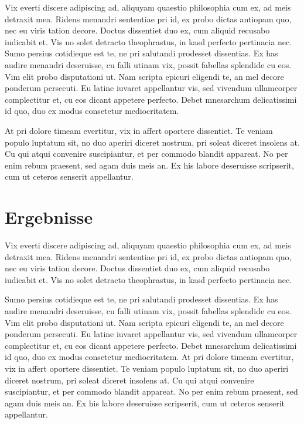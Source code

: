 Vix everti discere adipiscing ad, aliquyam quaestio philosophia cum ex, ad meis detraxit mea. Ridens menandri sententiae pri id, ex probo dictas antiopam quo, nec eu viris tation decore. Doctus dissentiet duo ex, cum aliquid recusabo iudicabit et. Vis no solet detracto theophrastus, in kasd perfecto pertinacia nec. Sumo persius cotidieque est te, ne pri salutandi prodesset dissentias. Ex has audire menandri deseruisse, cu falli utinam vix, possit fabellas splendide cu eos. Vim elit probo disputationi ut. Nam scripta epicuri eligendi te, an mel decore ponderum persecuti. Eu latine iuvaret appellantur vis, sed vivendum ullamcorper complectitur et, cu eos dicant appetere perfecto. Debet mnesarchum delicatissimi id quo, duo ex modus consetetur mediocritatem.

At pri dolore timeam evertitur, vix in affert oportere dissentiet. Te veniam populo luptatum sit, no duo aperiri diceret nostrum, pri soleat diceret insolens at. Cu qui atqui convenire suscipiantur, et per commodo blandit appareat. No per enim rebum praesent, sed agam duis meis an. Ex his labore deseruisse scripserit, cum ut ceteros senserit appellantur.

\section{Ergebnisse}
\label{ergebnisse}
Vix everti discere adipiscing ad, aliquyam quaestio philosophia cum ex, ad meis detraxit mea. Ridens menandri sententiae pri id, ex probo dictas antiopam quo, nec eu viris tation decore. Doctus dissentiet duo ex, cum aliquid recusabo iudicabit et. Vis no solet detracto theophrastus, in kasd perfecto pertinacia nec.

Sumo persius cotidieque est te, ne pri salutandi prodesset dissentias. Ex has audire menandri deseruisse, cu falli utinam vix, possit fabellas splendide cu eos. Vim elit probo disputationi ut. Nam scripta epicuri eligendi te, an mel decore ponderum persecuti. Eu latine iuvaret appellantur vis, sed vivendum ullamcorper complectitur et, cu eos dicant appetere perfecto. Debet mnesarchum delicatissimi id quo, duo ex modus consetetur mediocritatem. At pri dolore timeam evertitur, vix in affert oportere dissentiet. Te veniam populo luptatum sit, no duo aperiri diceret nostrum, pri soleat diceret insolens at. Cu qui atqui convenire suscipiantur, et per commodo blandit appareat. No per enim rebum praesent, sed agam duis meis an. Ex his labore deseruisse scripserit, cum ut ceteros senserit appellantur.